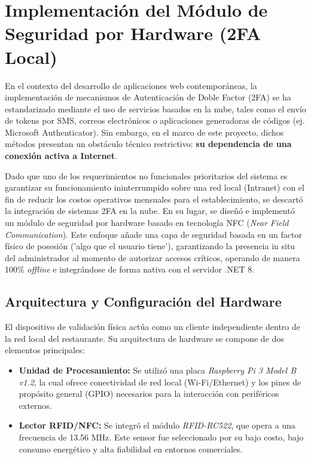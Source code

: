 \section{Implementación del Módulo de Seguridad por Hardware (2FA Local)}

En el contexto del desarrollo de aplicaciones web contemporáneas, la implementación de mecanismos de Autenticación de Doble Factor (2FA) se ha estandarizado mediante el uso de servicios basados en la nube, tales como el envío de tokens por SMS, correos electrónicos o aplicaciones generadoras de códigos (ej. Microsoft Authenticator). Sin embargo, en el marco de este proyecto, dichos métodos presentan un obstáculo técnico restrictivo: \textbf{su dependencia de una conexión activa a Internet}.

Dado que uno de los requerimientos no funcionales prioritarios del sistema es garantizar su funcionamiento ininterrumpido sobre una red local (Intranet) con el fin de reducir los costos operativos mensuales para el establecimiento, se descartó la integración de sistemas 2FA en la nube. En su lugar, se diseñó e implementó un módulo de seguridad por hardware basado en tecnología NFC (\textit{Near Field Communication}). Este enfoque añade una capa de seguridad basada en un factor físico de posesión ('algo que el usuario tiene'), garantizando la presencia in situ del administrador al momento de autorizar accesos críticos, operando de manera 100\% \textit{offline} e integrándose de forma nativa con el servidor .NET 8.

\subsection{Arquitectura y Configuración del Hardware}

El dispositivo de validación física actúa como un cliente independiente dentro de la red local del restaurante. Su arquitectura de hardware se compone de dos elementos principales:

\begin{itemize}
	\item \textbf{Unidad de Procesamiento:} Se utilizó una placa \textit{Raspberry Pi 3 Model B v1.2}, la cual ofrece conectividad de red local (Wi-Fi/Ethernet) y los pines de propósito general (GPIO) necesarios para la interacción con periféricos externos.
	\item \textbf{Lector RFID/NFC:} Se integró el módulo \textit{RFID-RC522}, que opera a una frecuencia de 13.56 MHz. Este sensor fue seleccionado por su bajo costo, bajo consumo energético y alta fiabilidad en entornos comerciales.
\end{itemize}

